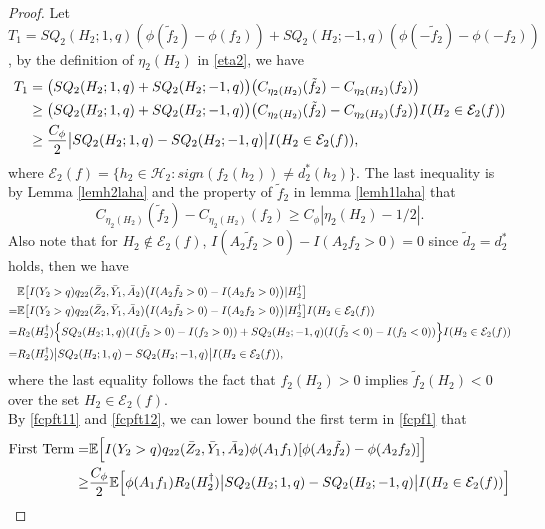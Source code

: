 \documentclass[10pt]{article}
\theoremstyle{remark} \newtheorem{rem}{Remark}
\begin{document}
\begin{proof}
    
    Let $T_1=SQ_2(H_2;1,q)(\phi(\tilde f_2)-\phi(f_2)) + SQ_2(H_2;-1,q)(\phi(-\tilde f_2)-\phi(-f_2))$, by the definition of $\eta_2(H_2)$ in \eqref{eta2}, we have  
    \begin{align}
    T_1 &= \big(SQ_2(H_2;1,q) + SQ_2(H_2;-1,q)\big)\big(C_{\eta_2(H_2)}(\tilde f_2)-C_{\eta_2(H_2)}(f_2)\big) \notag\\
    &\geq \big(SQ_2(H_2;1,q) + SQ_2(H_2;-1,q)\big)\big(C_{\eta_2(H_2)}(\tilde f_2)-C_{\eta_2(H_2)}(f_2)\big)  I(H_2\in \mathcal{E}_2(f)) \notag \\
    &\geq \frac{C_\phi}{2}\big|SQ_2(H_2;1,q) - SQ_2(H_2;-1,q) \big| I(H_2\in \mathcal{E}_2(f)), \label{fcpft11}
    \end{align}
    where $\mathcal{E}_2(f)=\{h_2\in \mathcal H_2:sign(f_2(h_2)) \neq d^*_2(h_2)\}$.
    The last inequality is by Lemma \ref{lemh2laha} and the property of $\tilde f_2$ in lemma \ref{lemh1laha} that 
    \[
    C_{\eta_2(H_2)}(\tilde f_2) - C_{\eta_2(H_2)}(f_2) \geq C_\phi|\eta_2(H_2)-1/2|.
    \]
    Also note that for $H_2 \notin \mathcal{E}_2(f)$, $I(A_2\tilde f_2>0) - I(A_2f_2>0) = 0$ since $\tilde d_2 = d_2^*$ holds, then we have
    \begin{align}
            &\mathbb{E}\big[I(Y_2>q)q_{22}(\bar Z_{2}, \bar Y_{1}, \bar A_{2}) \big(I(A_2\tilde f_2>0)-I(A_2f_2>0)\big)|H_2^\dag\big] \notag\\
            =& \mathbb{E}\big[I(Y_2>q)q_{22}(\bar Z_{2}, \bar Y_{1}, \bar A_{2}) \big(I(A_2\tilde f_2>0)-I(A_2f_2>0)\big)|H_2^\dag\big]I(H_2 \in \mathcal{E}_2(f)) \notag\\
            =& R_2(H_2^\dag)\Big\{SQ_2(H_2;1,q)(I(\tilde f_2>0)-I(f_2>0)) + SQ_2(H_2;-1,q)(I(\tilde f_2<0)-I(f_2<0)) \Big\} I(H_2 \in \mathcal{E}_2(f)) \notag\\
            =& R_2(H_2^\dag)\big|SQ_2(H_2;1,q) - SQ_2(H_2;-1,q) \big| I(H_2\in \mathcal{E}_2(f)), \label{fcpft12}
        \end{align}
    where the last equality follows the fact that $f_2(H_2)>0$ implies $\tilde f_2(H_2)<0$ over the set $H_2 \in \mathcal{E}_2(f)$.\\
    By \eqref{fcpft11} and \eqref{fcpft12}, we can lower bound the first term in \eqref{fcpf1} that
    \begin{align}
        \text{First Term} =& \mathbb{E} \Big[I(Y_2>q)q_{22}(\bar Z_{2}, \bar Y_{1}, \bar A_{2})\phi(A_1f_1)[\phi(A_2\tilde f_2)-\phi(A_2f_2)]\Big] \notag\\
        \geq& \frac{C_\phi}{2}\mathbb{E} \Big[\phi(A_1f_1)R_2(H_2^\dag) \big|SQ_2(H_2;1,q) - SQ_2(H_2;-1,q) \big| I(H_2\in \mathcal{E}_2(f))  \Big] \notag\\

\end{align}
\end{proof}
\end{document}
